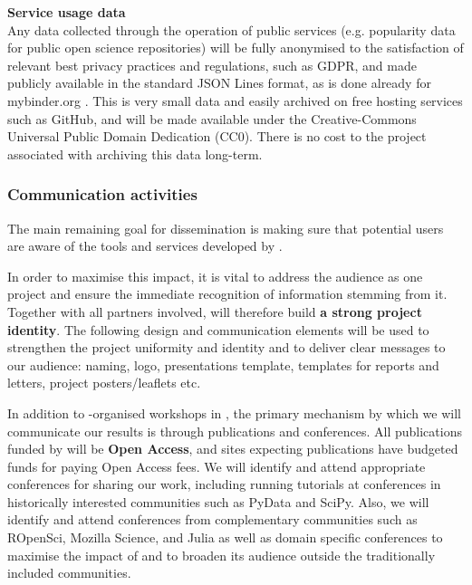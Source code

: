 \noindent \textbf{Service usage data} \\
Any data collected through the operation of public services
(e.g. popularity data for public open science repositories)
will be fully anonymised to the satisfaction of relevant best privacy practices and regulations, such as GDPR,
and made publicly available in the standard JSON Lines format,
as is done already for mybinder.org \cite{mybinder-archive}.
This is very small data and easily archived on free hosting services such as GitHub,
and will be made available under the Creative-Commons Universal Public Domain Dedication (CC0).
There is no cost to the project associated with archiving this data long-term.

\subsubsection{Communication activities}

The main remaining goal for dissemination is making sure that potential users
are aware of the tools and services developed by \TheProject.

In order to maximise this impact, it is vital to address the audience as one project
and ensure the immediate recognition of information stemming from it.
Together with all partners involved, \TheProject will therefore build \textbf{a strong project identity}.
The following design and communication elements will be used to strengthen the project
uniformity and identity and to deliver clear messages to our audience: \TheProject naming, logo,
presentations template, templates for reports and letters, project posters/leaflets etc.

In addition to \TheProject-organised workshops in
,
the primary mechanism by which we will communicate our results is through publications and conferences.
All publications funded by \TheProject will be \textbf{Open Access},
and sites expecting publications have budgeted funds for paying Open Access fees.
We will identify and attend appropriate conferences for sharing our work,
including running tutorials at conferences in historically interested communities such as PyData and SciPy.
Also, we will identify and attend conferences from complementary communities such as ROpenSci,
Mozilla Science, and Julia
as well as domain specific conferences to maximise the impact of \TheProject and to broaden its
audience outside the
traditionally included communities.

